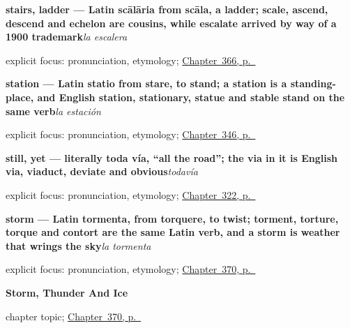 \noindent\begin{minipage}[t]{\linewidth}
\raggedright
\textbf{stairs, ladder — Latin scālāria from scāla, a ladder; scale, ascend, descend and echelon are cousins, while escalate arrived by way of a 1900 trademark}\enspace\emph{la escalera}\par
\footnotesize explicit focus: pronunciation, etymology; \hyperref[ch:la-caja-y-la-lampara]{Chapter~366, p.~\pageref*{ch:la-caja-y-la-lampara}}
\end{minipage}\par\smallskip

\noindent\begin{minipage}[t]{\linewidth}
\raggedright
\textbf{station — Latin statio from stare, to stand; a station is a standing-place, and English station, stationary, statue and stable stand on the same verb}\enspace\emph{la estación}\par
\footnotesize explicit focus: pronunciation, etymology; \hyperref[ch:lugares-del-pueblo]{Chapter~346, p.~\pageref*{ch:lugares-del-pueblo}}
\end{minipage}\par\smallskip

\noindent\begin{minipage}[t]{\linewidth}
\raggedright
\textbf{still, yet — literally toda vía, \textquotedblleft{}all the road\textquotedblright{}; the via in it is English via, viaduct, deviate and obvious}\enspace\emph{todavía}\par
\footnotesize explicit focus: pronunciation, etymology; \hyperref[ch:anoche-y-todavia]{Chapter~322, p.~\pageref*{ch:anoche-y-todavia}}
\end{minipage}\par\smallskip

\noindent\begin{minipage}[t]{\linewidth}
\raggedright
\textbf{storm — Latin tormenta, from torquere, to twist; torment, torture, torque and contort are the same Latin verb, and a storm is weather that wrings the sky}\enspace\emph{la tormenta}\par
\footnotesize explicit focus: pronunciation, etymology; \hyperref[ch:la-tormenta-y-el-trueno]{Chapter~370, p.~\pageref*{ch:la-tormenta-y-el-trueno}}
\end{minipage}\par\smallskip

\noindent\begin{minipage}[t]{\linewidth}
\raggedright
\textbf{Storm, Thunder And Ice}\par
\footnotesize chapter topic; \hyperref[ch:la-tormenta-y-el-trueno]{Chapter~370, p.~\pageref*{ch:la-tormenta-y-el-trueno}}
\end{minipage}\par\smallskip

